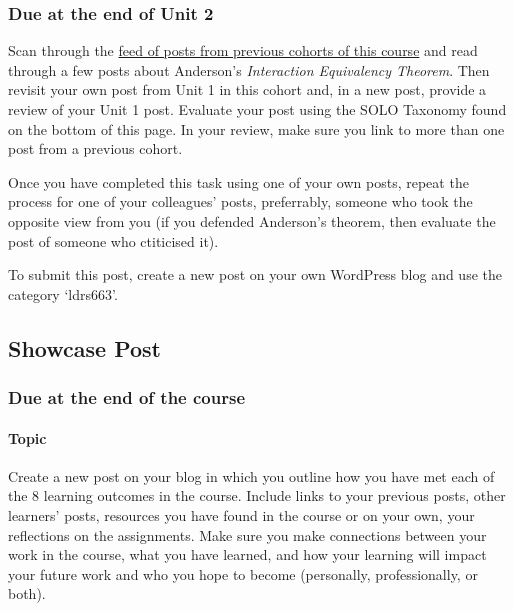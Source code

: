 \documentclass[
]{book}
\begin{document}
\hypertarget{due-at-the-end-of-unit-2}{%
\subsubsection*{Due at the end of Unit 2}\label{due-at-the-end-of-unit-2}}

Scan through the \href{https://ma-lead.github.io/ldrs663/feeds}{feed of posts from previous cohorts of this course} and read through a few posts about Anderson's \emph{Interaction Equivalency Theorem}. Then revisit your own post from Unit 1 in this cohort and, in a new post, provide a review of your Unit 1 post. Evaluate your post using the SOLO Taxonomy found on the bottom of this page. In your review, make sure you link to more than one post from a previous cohort.

Once you have completed this task using one of your own posts, repeat the process for one of your colleagues' posts, preferrably, someone who took the opposite view from you (if you defended Anderson's theorem, then evaluate the post of someone who ctiticised it).

To submit this post, create a new post on your own WordPress blog and use the category `ldrs663'.

\hypertarget{showcase-post}{%
\subsection*{Showcase Post}\label{showcase-post}}

\hypertarget{due-at-the-end-of-the-course}{%
\subsubsection*{Due at the end of the course}\label{due-at-the-end-of-the-course}}

\hypertarget{topic-1}{%
\paragraph*{Topic}\label{topic-1}}

Create a new post on your blog in which you outline how you have met each of the 8 learning outcomes in the course. Include links to your previous posts, other learners' posts, resources you have found in the course or on your own, your reflections on the assignments. Make sure you make connections between your work in the course, what you have learned, and how your learning will impact your future work and who you hope to become (personally, professionally, or both).
\end{document}
